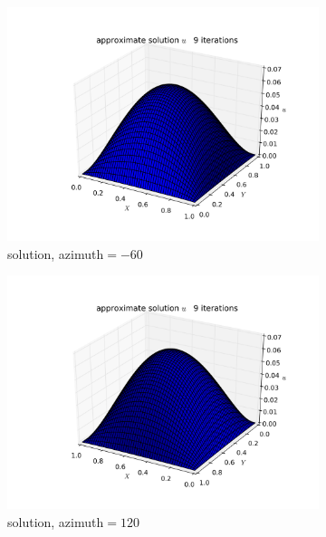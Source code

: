\documentclass{article} %
\theoremstyle{plain}
\numberwithin{equation}{section} %
\numberwithin{figure}{section} %
\numberwithin{table}{section} %
\begin{document}
\begin{figure}[!htb]
    \centering
    \begin{subfigure}[b]{0.45\textwidth}
        \centering
        \includegraphics[width=\textwidth]{figures/p1_run2_1.png}
        \caption*{solution, azimuth$=-60$}
    \end{subfigure}
    \hfill
    \begin{subfigure}[b]{0.45\textwidth}
        \centering
        \includegraphics[width=\textwidth]{figures/p1_run2_2.png}
        \caption*{solution, azimuth$=120$}
    \end{subfigure}
    \hfill
    \begin{subfigure}[b]{0.45\textwidth}
        \centering

\end{subfigure}
\end{figure}
\end{document}
